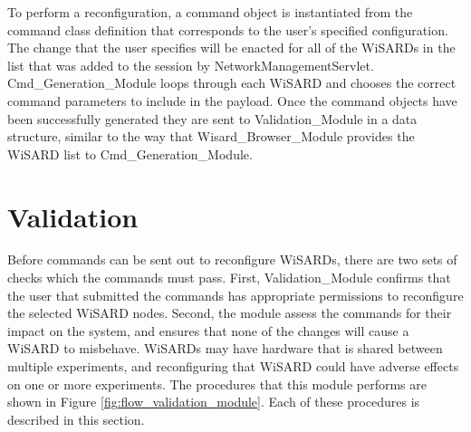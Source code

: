 To perform a reconfiguration, a command object is instantiated from the command class definition that corresponds to the user's specified configuration. The change that the user specifies will be enacted for all of the WiSARDs in the list that was added to the session by NetworkManagementServlet. Cmd\_Generation\_Module loops through each WiSARD and chooses the correct command parameters to include in the payload. Once the command objects have been successfully generated they are sent to Validation\_Module in a data structure, similar to the way that Wisard\_Browser\_Module provides the WiSARD list to Cmd\_Generation\_Module.



\section{Validation}
Before commands can be sent out to reconfigure WiSARDs, there are two sets of checks which the commands must pass. First, Validation\_Module confirms that the user that submitted the commands has appropriate permissions to reconfigure the selected WiSARD nodes. Second, the module assess the commands for their impact on the system, and ensures that none of the changes will cause a WiSARD to misbehave. WiSARDs may have hardware that is shared between multiple experiments, and reconfiguring that WiSARD could have adverse effects on one or more experiments. The procedures that this module performs are shown in Figure \ref{fig:flow_validation_module}. Each of these procedures is described in this section.\\


